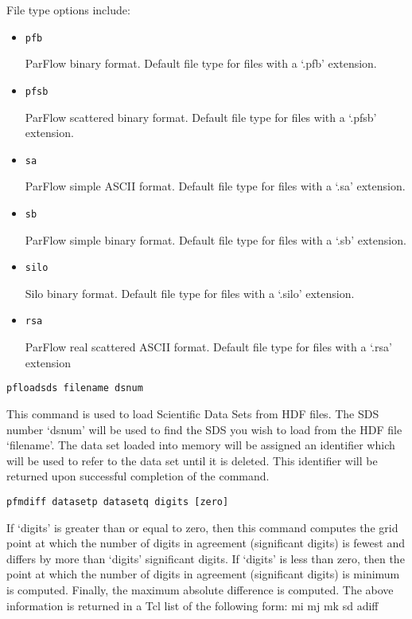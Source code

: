 \begin{description}
      File type options include:
\begin{itemize}
\item{\begin{verbatim}pfb\end{verbatim}} ParFlow binary format.
Default file type for files with a `.pfb' extension.
\item{\begin{verbatim}pfsb\end{verbatim}}  ParFlow scattered binary format.
Default file type for files with a `.pfsb' extension.
\item{\begin{verbatim}sa\end{verbatim}}  ParFlow simple ASCII format.
Default file type for files with a `.sa' extension.
\item{\begin{verbatim}sb\end{verbatim}} ParFlow simple binary format.
Default file type for files with a `.sb' extension.
\item{\begin{verbatim}silo\end{verbatim}} Silo binary format.
Default file type for files with a `.silo' extension.
\item{\begin{verbatim}rsa\end{verbatim}} ParFlow real scattered ASCII format.
Default file type for files with a `.rsa' extension
\end{itemize}


\item{\begin{verbatim}pfloadsds filename dsnum\end{verbatim}}
This command is used to load Scientific Data Sets from HDF files.
The SDS number `dsnum' will be used to find the SDS you wish to load
from the HDF file `filename'.  The data set loaded into memory will
be assigned an identifier which will be used to refer to the data set
until it is deleted.  This identifier will be returned upon
successful completion of the command.


\item{\begin{verbatim}pfmdiff datasetp datasetq digits [zero]\end{verbatim}}
If `digits' is greater than or equal to zero, then this command
computes the grid point at which the number of digits in agreement
(significant digits) is fewest and differs by more than `digits'
significant digits.  If `digits' is less than zero, then the point
at which the number of digits in agreement (significant digits) is
minimum is computed.  Finally, the maximum absolute difference is
computed.  The above information is returned in a Tcl list
of the following form:
{mi mj mk sd} adiff


\end{description}

